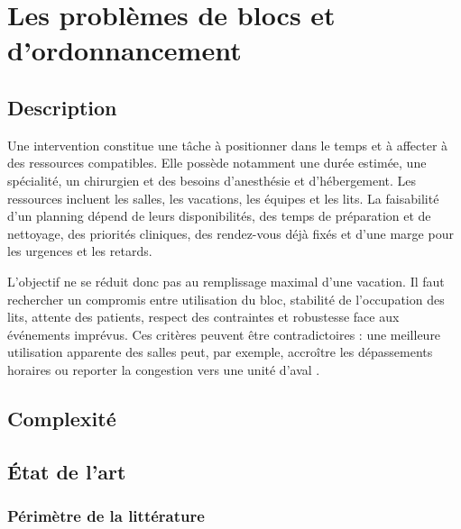 \chapter{Les problèmes de blocs et d'ordonnancement}
\label{chap:probleme}

\section{Description}

Une intervention constitue une tâche à positionner dans le temps et à affecter à des ressources compatibles. Elle possède notamment une durée estimée, une spécialité, un chirurgien et des besoins d'anesthésie et d'hébergement. Les ressources incluent les salles, les vacations, les équipes et les lits. La faisabilité d'un planning dépend de leurs disponibilités, des temps de préparation et de nettoyage, des priorités cliniques, des rendez-vous déjà fixés et d'une marge pour les urgences et les retards.

L'objectif ne se réduit donc pas au remplissage maximal d'une vacation. Il faut rechercher un compromis entre utilisation du bloc, stabilité de l'occupation des lits, attente des patients, respect des contraintes et robustesse face aux événements imprévus. Ces critères peuvent être contradictoires : une meilleure utilisation apparente des salles peut, par exemple, accroître les dépassements horaires ou reporter la congestion vers une unité d'aval \parencite{alamin2025,schouten2023}.


\section{Complexité}


\section{État de l'art}

\subsection{Périmètre de la littérature}

